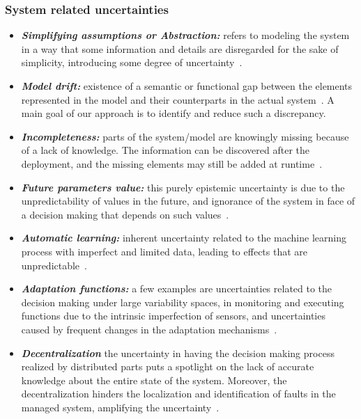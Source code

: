 \subsubsection{System related uncertainties}
\begin{itemize}
	\item \textbf{\textit{Simplifying assumptions or Abstraction:}} refers to modeling the system in a way that some information and details are disregarded for the sake of simplicity, introducing some degree of uncertainty~\cite{EsfahaniM10}.
	
	\item \textbf{\textit{Model drift:}} existence of a semantic or functional gap between the elements represented in the model and their counterparts in the actual system~\cite{EsfahaniM10,GhezziS11}. A main goal of our approach is to identify and reduce such a discrepancy.
	
	\item \textbf{\textit{Incompleteness:}} parts of the system/model are knowingly missing because of a lack of knowledge. The information can be discovered after the deployment, and the missing elements may still be added at runtime~\cite{perez2014uncertainties}.
	
	\item \textbf{\textit{Future parameters value:}} this purely epistemic uncertainty is due to the unpredictability of values in the future, and ignorance of the system in face of a decision making that depends on such values~\cite{EsfahaniM10}.
	
	\item \textbf{\textit{Automatic learning:}} inherent uncertainty related to the machine learning process with imperfect and limited data, leading to effects that are unpredictable~\cite{garlan2010software,cheung2007identifying,robert2014machine}.
	
	\item \textbf{\textit{Adaptation functions:}} a few examples are uncertainties related to the decision making under large variability spaces, in monitoring and executing functions due to the intrinsic imperfection of sensors, and uncertainties caused by frequent changes in the adaptation mechanisms~\cite{EsfahaniM10,Villegas}.
	
	\item \textbf{\textit{Decentralization}} the uncertainty in having the decision making process realized by distributed parts puts a spotlight on the lack of accurate knowledge about the entire state of the system. Moreover, the decentralization hinders the localization and identification of faults in the managed system, amplifying the uncertainty~\cite{iftikhar2012case,EsfahaniM10,Arcaini2017,d2017model}.
\end{itemize}

